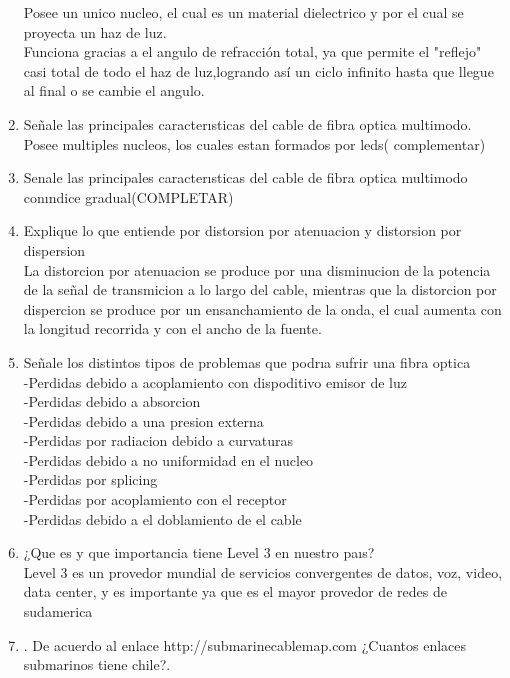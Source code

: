 \documentclass{udparticle}
\begin{document}
\begin{enumerate}
  Posee un unico nucleo, el cual es un material dielectrico y por el cual se proyecta un haz de luz.\\
  Funciona gracias a el angulo de refracción total, ya que permite el "reflejo" casi total de todo el haz de luz,logrando así
  un ciclo infinito hasta que llegue al final o se cambie el angulo.
  \item Señale las principales caracterısticas del cable de ﬁbra optica multimodo. \\
  Posee multiples nucleos, los cuales estan formados por leds(  complementar)\\
  \item Senale las principales caracterısticas del cable de ﬁbra optica multimodo conındice gradual(COMPLETAR)\\
  \item Explique lo que entiende por distorsion por atenuacion y distorsion por dispersion\\
  La distorcion por atenuacion se produce por una disminucion de la potencia de la señal de transmicion a lo largo del cable, mientras que la distorcion por dispercion se produce por un ensanchamiento de la onda, el cual aumenta con la longitud recorrida y con el ancho de la fuente.\\
  \item Señale los distintos tipos de problemas que podrıa sufrir una ﬁbra optica\\
  -Perdidas debido a acoplamiento con dispoditivo emisor de luz\\
  -Perdidas debido a absorcion\\
  -Perdidas debido a una presion externa\\
  -Perdidas por radiacion debido a curvaturas \\
  -Perdidas debido a no uniformidad en el nucleo\\
  -Perdidas por splicing\\
  -Perdidas por acoplamiento con el receptor\\
  -Perdidas debido a el doblamiento de el cable\\
  \item ¿Que es y que importancia tiene Level 3 en nuestro paıs?\\
  Level 3 es un provedor mundial de servicios convergentes de datos, voz, video, data center, y es importante ya que es el mayor provedor de redes de sudamerica\\
  \item . De acuerdo al enlace http://submarinecablemap.com ¿Cuantos enlaces submarinos tiene chile?.

\end{enumerate}
\end{document}
